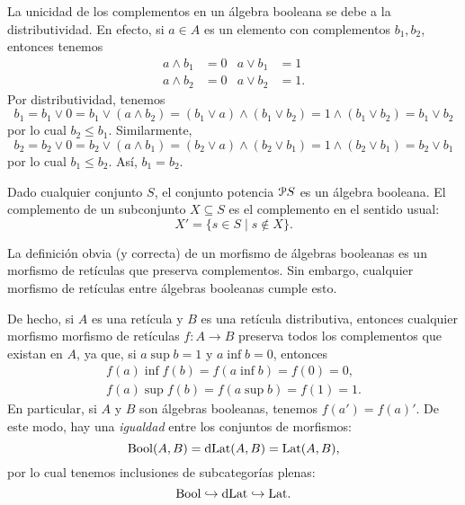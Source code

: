 La unicidad de los complementos en un álgebra booleana se debe
a la distributividad. En efecto, si $a\in A$ es un elemento con
complementos $b_1,b_2$, entonces tenemos
  \begin{align*}
    a\wedge b_1&=0 & a\vee b_1&=1 \\
    a\wedge b_2&=0 & a\vee b_2&=1.
  \end{align*}
  Por distributividad, tenemos
  \[
    b_1
    =b_1\vee 0
    =b_1\vee (a\wedge b_2)
    =(b_1\vee a)\wedge (b_1\vee b_2)
    =1\wedge (b_1\vee b_2)
    =b_1\vee b_2
  \]
  por lo cual $b_2\leq b_1$.
  Similarmente,
  \[
    b_2
    =b_2\vee 0
    =b_2\vee (a \wedge b_1)
    =(b_2\vee a)\wedge (b_2\vee b_1)
    =1\wedge (b_2\vee b_1)
    =b_2\vee b_1
  \]
  por lo cual $b_1\leq b_2$.
  Así, $b_1=b_2$.

\begin{exa}
    Dado cualquier conjunto $S$, el conjunto potencia $\cal PS$
    es un álgebra booleana.
    El complemento de un subconjunto $X\subseteq S$ es el
    complemento en el sentido usual:
    \[
      X' = \{s\in S \mid s\not\in X\}
    .\]
\end{exa}

\begin{obs}\label{obs:bool-plena-en-dlat}
La definición obvia (y correcta) de un morfismo de álgebras booleanas
es un morfismo de retículas que preserva complementos. Sin embargo,
cualquier morfismo de retículas entre álgebras booleanas cumple esto.

De hecho, si $A$ es una retícula y $B$ es una retícula distributiva,
entonces cualquier morfismo morfismo de retículas $f:A\to B$ preserva
todos los complementos que existan en $A$, ya que, si $a\sup b=1$
y $a\inf b=0$, entonces
\begin{align*}
  f(a)\inf f(b)=f(a\inf b)=f(0)=0, \\
  f(a)\sup f(b)=f(a\sup b)=f(1)=1.
\end{align*} 
En particular, si $A$ y $B$ son álgebras booleanas, tenemos
$f(a')=f(a)'$.
De este modo, hay una \emph{igualdad} entre los conjuntos de
morfismos:
\[
  \Bool(A,B) = \DLat(A,B) = \Lat(A,B)
,\]
por lo cual tenemos inclusiones de subcategorías plenas:
\begin{equation}
  \Bool \rmono \DLat \rmono \Lat.
\end{equation}
\end{obs}

